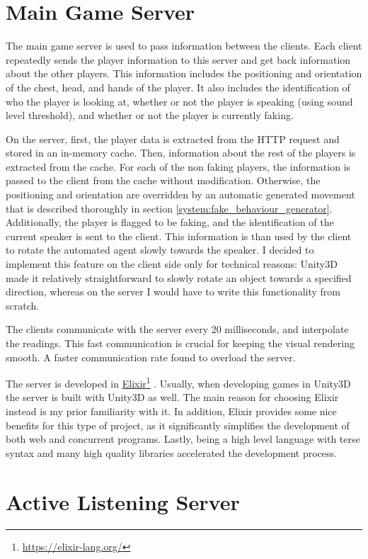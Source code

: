 \documentclass[]{simple-thesis}
\newcommand\fnurl[2]{%
  \href{#2}{#1}\footnote{\url{#2}}%
}
\begin{document}
\section{Main Game Server}

The main game server is used to pass information between the clients.
Each client repeatedly sends the player information to this server and get back information about the other players.
This information includes the positioning and orientation of the chest, head, and hands of the player.
It also includes the identification of who the player is looking at, whether or not the player is speaking (using sound level threshold), and whether or not the player is currently faking.

On the server, first, the player data is extracted from the HTTP request and stored in an in-memory cache.
Then, information about the rest of the players is extracted from the cache.
For each of the non faking players, the information is passed to the client from the cache without modification.
Otherwise, the positioning and orientation are overridden by an automatic generated movement that is described thoroughly in section \ref{system:fake_behaviour_generator}.
Additionally, the player is flagged to be faking, and the identification of the current speaker is sent to the client.
This information is than used by the client to rotate the automated agent slowly towards the speaker.
I decided to implement this feature on the client side only for technical reasons:
Unity3D made it relatively straightforward to slowly rotate an object towards a specified direction, whereas on the server I would have to write this functionality from scratch.

The clients communicate with the server every 20 milliseconds, and interpolate the readings.
This fast communication is crucial for keeping the visual rendering smooth.
A faster communication rate found to overload the server.

The server is developed in \fnurl{Elixir}{https://elixir-lang.org/}.
Usually, when developing games in Unity3D the server is built with Unity3D as well.
The main reason for choosing Elixir instead is my prior familiarity with it.
In addition, Elixir provides some nice benefits for this type of project, as it significantly simplifies the development of both web and concurrent programs.
Lastly, being a high level language with terse syntax and many high quality libraries accelerated the development process.

\section{Active Listening Server}\label{system:active_listening_server}
\end{document}
